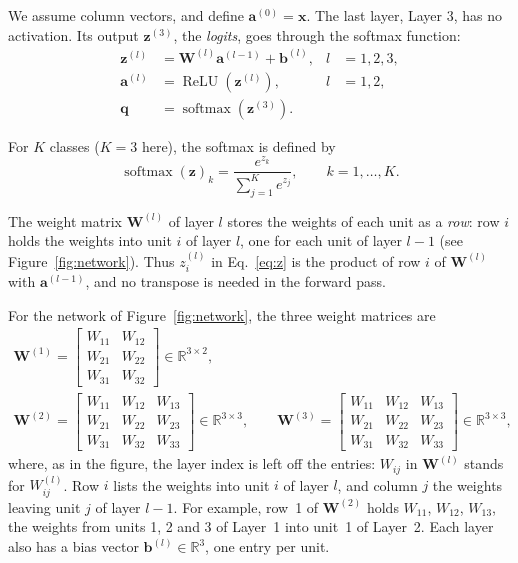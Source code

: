 \documentclass[12pt]{article}
\numberwithin{equation}{section} %
\newcommand{\relu}{\operatorname{ReLU}}
\newcommand{\softmax}{\operatorname{softmax}}
\newcommand{\R}{\mathbb{R}}
\newcommand{\vc}[1]{\symbf{#1}}
\begin{document}
\bigskip

We assume column vectors, and define $\vc{a}^{(0)}=\vc{x}$.
The last layer, Layer 3, has no activation. Its output
$\vc{z}^{(3)}$, the \emph{logits}, goes through the softmax
function:
\begin{align}
  \vc{z}^{(l)} &= \vc{W}^{(l)}\vc{a}^{(l-1)}+\vc{b}^{(l)}, & l&=1,2,3,\label{eq:z}\\
  \vc{a}^{(l)} &= \relu(\vc{z}^{(l)}), & l&=1,2,\label{eq:a}\\
  \vc{q} &= \softmax(\vc{z}^{(3)}).\label{eq:q}
\end{align}

For $K$ classes ($K=3$ here), the softmax is defined by
\begin{equation}\label{eq:softmax}
  \softmax(\vc{z})_k=\frac{e^{z_k}}{\sum_{j=1}^{K}e^{z_j}},
  \qquad k=1,\dots,K.
\end{equation}

The weight matrix $\vc{W}^{(l)}$ of layer $l$ stores the weights of each unit as
a \emph{row}: row $i$ holds the weights into unit $i$ of layer $l$, one for each
unit of layer $l-1$ (see Figure~\ref{fig:network}). Thus $z^{(l)}_i$ in
Eq.~\eqref{eq:z} is the product of row $i$ of $\vc{W}^{(l)}$ with
$\vc{a}^{(l-1)}$, and no transpose is needed in the forward pass.

For the network of Figure~\ref{fig:network}, the three weight matrices are
\begin{equation}
  \begin{gathered}
    \vc{W}^{(1)}=\begin{bmatrix}
      W_{11} & W_{12}\\
      W_{21} & W_{22}\\
      W_{31} & W_{32}
    \end{bmatrix}\in\R^{3\times2},\\[6pt]
    \vc{W}^{(2)}=\begin{bmatrix}
      W_{11} & W_{12} & W_{13}\\
      W_{21} & W_{22} & W_{23}\\
      W_{31} & W_{32} & W_{33}
    \end{bmatrix}\in\R^{3\times3},\qquad
    \vc{W}^{(3)}=\begin{bmatrix}
      W_{11} & W_{12} & W_{13}\\
      W_{21} & W_{22} & W_{23}\\
      W_{31} & W_{32} & W_{33}
    \end{bmatrix}\in\R^{3\times3},
  \end{gathered}
  \label{eq:Wmats}
\end{equation}
where, as in the figure, the layer index is left off
the entries: $W_{ij}$ in $\vc{W}^{(l)}$ stands for
$W^{(l)}_{ij}$. Row $i$ lists the weights into
unit $i$ of layer $l$, and column $j$ the weights
leaving unit $j$ of layer $l-1$. For
example, row~1 of $\vc{W}^{(2)}$ holds $W_{11}$,
$W_{12}$, $W_{13}$, the weights from units 1, 2 and 3
of Layer~1 into unit~1 of Layer~2. Each layer also has a
bias vector $\vc{b}^{(l)}\in\R^{3}$, one entry per unit.
\end{document}
